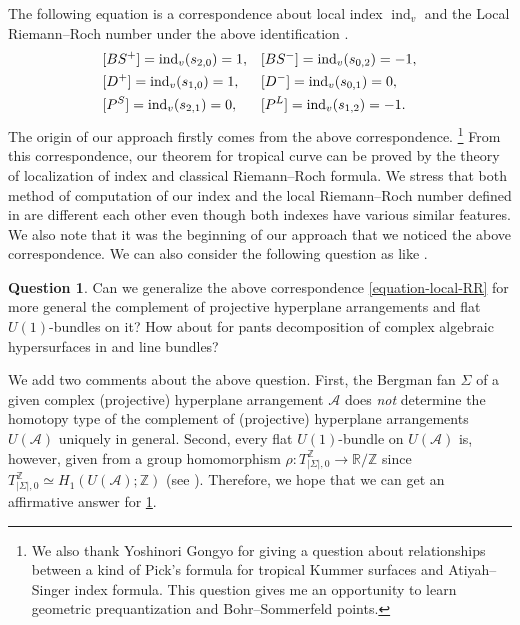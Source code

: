 \documentclass[a4paper,dvipdfmx,reqno,12pt]{amsart}
\theoremstyle{definition}
\newtheorem{question}[theorem]{Question}
\newcommand{\opn}[1]{\operatorname{#1}}
\newcommand{\myfootnote}[1]{\hspace{-5pt}\footnote{#1}}
\numberwithin{equation}{section}
\begin{document}
The following equation is a correspondence about 
local index $\opn{ind}_v$ and the Local 
Riemann--Roch number under the above 
identification \cite[Theorem 6.7]{MR2676658}.
\begin{align} \label{equation-local-RR}
& [BS^{+}]=\opn{ind}_v(s_{2,0})=1, 
&& [BS^{-}]=\opn{ind}_v(s_{0,2})=-1,\notag \\
& [D^{+}]=\opn{ind}_v(s_{1,0})=1,
&& [D^{-}]=\opn{ind}_v(s_{0,1})=0, \\
& [P^{S}]=\opn{ind}_v(s_{2,1})=0,
&& [P^{L}]=\opn{ind}_v(s_{1,2})=-1 \notag.
\end{align}
The origin of our approach firstly comes from the 
above correspondence.
\myfootnote{
We also thank Yoshinori Gongyo for 
giving a question about relationships 
between a kind of Pick's formula for
tropical Kummer surfaces and Atiyah--Singer
index formula. This question gives me 
an opportunity to learn geometric prequantization and
Bohr--Sommerfeld points.
}
From this correspondence, 
our theorem for tropical curve can be 
proved by the theory of localization of index 
and classical Riemann--Roch formula.
We stress that both method of computation
of our index and the local Riemann--Roch number
defined in \cite{MR2676658} are different 
each other even though both indexes have various 
similar features.
We also note that it was the beginning of our 
approach that we 
noticed the above correspondence.
We can also consider the following question as 
like \cite{auroux2022lagrangian}.

\begin{question} \label{question-tropical-complex-rr}
Can we generalize the 
above correspondence \ref{equation-local-RR}
for more general the complement of
projective hyperplane arrangements and flat $U(1)$-bundles on it?
How about for pants decomposition of
  complex algebraic hypersurfaces in \cite{MR2079993} and line bundles?
\end{question}

We add two comments about the above question. 
First, the Bergman fan $\Sigma$ of a given complex 
(projective) hyperplane arrangement $\mathcal{A}$ does \emph{not} 
determine 
the homotopy type of the complement of (projective) 
hyperplane
arrangements $U(\mathcal{A})$ uniquely in general.
Second, every flat $U(1)$-bundle on 
$U(\mathcal{A})$ is, 
however, given
from a group homomorphism 
$\rho\colon T_{|\Sigma|,0}^{\mathbb{Z}}\to 
\mathbb{R}/\mathbb{Z}$ since 
$T_{|\Sigma|,0}^{\mathbb{Z}}\simeq 
H_1(U(\mathcal{A});\mathbb{Z})$ (see \cite[Theorem 4]{MR3153919}).
Therefore, we hope that we can get an affirmative answer 
for \cref{question-tropical-complex-rr}.
\end{document}
